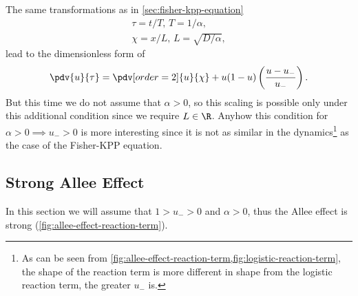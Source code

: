 The same transformations as in \cref{sec:fisher-kpp-equation} \begin{gather*}
    \tau = t/T,\, T = 1/\alpha, \\
    \chi = x/L,\,L=\sqrt{D/\alpha},
    \end{gather*} lead to the dimensionless form of \begin{equation}
        \label{eq:allee-transformation}
        \pdv{u}{\tau} = \pdv[order=2]{u}{\chi} + u (1 - u ) \left(\frac{u - u_{-}}{u_{-}}\right).
    \end{equation}
But this time we do not assume that \(\alpha > 0\), so this scaling is possible only under this additional condition 
    since we require \(L \in \R\).
Anyhow this condition for \(\alpha > 0 \implies u_{-} > 0\) is more interesting since it is not as similar in the
    dynamics\footnote{As can be seen from \cref{fig:allee-effect-reaction-term,fig:logistic-reaction-term}, the shape
    of the reaction term is more different in shape from the logistic reaction term, the greater \(u_{-}\) is.} as the
    case of the Fisher-\ac{KPP} equation.

\subsection{Strong Allee Effect}%
\label{sub:strong-allee-effect}

In this section we will assume that \(1 > u_{-} > 0\) and \(\alpha > 0\), thus the Allee effect is strong
    (\cref{fig:allee-effect-reaction-term}).


